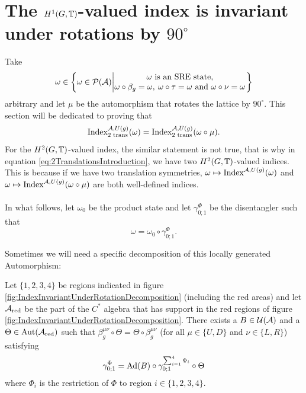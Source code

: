 \documentclass[11pt,a4paper,twoside]{article}
\numberwithin{equation}{section}
\begin{document}
	\section{The $H^1(G,\TT)$-valued index is invariant under rotations by $90^\circ$}\label{sec:H1ValuedIndexInvariantUnderRotations}
	Take
	\begin{equation}
		\omega\in\left\{\omega\in\PP(\AA)\left| \begin{matrix}\omega\text{ is an SRE state,}\\\omega\circ\beta_g=\omega,\:\omega\circ\tau=\omega\text{ and }\omega\circ\nu=\omega\end{matrix} \right.\right\}
	\end{equation}
	arbitrary and let $\mu$ be the automorphism that rotates the lattice by $90^\circ$. This section will be dedicated to proving that
	\begin{equation}
		\textrm{Index}_{\text{2 trans}}^{\AA,U(g)}(\omega)=\textrm{Index}_{\text{2 trans}}^{\AA,U(g)}(\omega\circ\mu).
	\end{equation}
	For the $H^2(G,\TT)$-valued index, the similar statement is not true, that is why in equation \eqref{eq:2TranslationsIntroduction}, we have two $H^2(G,\TT)$-valued indices. This is because if we have two translation symmetries, $\omega\mapsto\textrm{Index}^{\AA,U(g)}(\omega)$ and $\omega\mapsto\textrm{Index}^{\AA,U(g)}(\omega\circ\mu)$ are both well-defined indices.
	\\\\
	In what follows, let $\omega_0$ be the product state and let $\gamma^\Phi_{0;1}$ be the disentangler such that
	\begin{equation}
		\omega=\omega_0\circ\gamma^\Phi_{0;1}.
	\end{equation}
	
	Sometimes we will need a specific decomposition of this locally generated Automorphism:
	\begin{lemma}\label{lem:DecompositionOfLGAInCross}
		Let $\{1,2,3,4\}$ be regions indicated in figure \ref{fig:IndexInvariantUnderRotationDecomposition} (including the red areas) and let $\AA_{\text{red}}$ be the part of the $C^*$ algebra that has support in the red regions of figure \ref{fig:IndexInvariantUnderRotationDecomposition}. There exists a $B\in\UU(\AA)$ and a $\Theta\in\Aut{\AA_{\text{red}}}$ such that $\beta^{\mu\nu}_g\circ\Theta=\Theta\circ\beta^{\mu\nu}_g$ (for all $\mu\in\{U,D\}$ and $\nu\in\{L,R\}$) satisfying
		\begin{equation}
			\gamma^\Phi_{0;1}=\Ad{B}\circ\gamma^{\sum_{i=1}^4\Phi_i}_{0;1}\circ\Theta
		\end{equation}
		where $\Phi_i$ is the restriction of $\Phi$ to region $i\in\{1,2,3,4\}$.
	\end{lemma}
\end{document}
